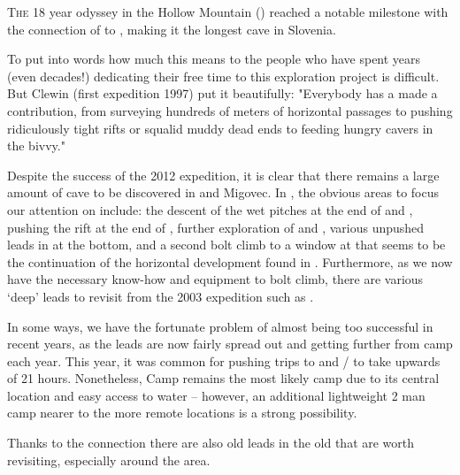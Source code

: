 \thispagestyle{endchapter}

\begin{tcolorbox}
\vspace{80pt}

\lettrine{T}{he} 18 year odyssey in the Hollow Mountain () reached a notable milestone with the connection of  to , making it the longest cave in Slovenia.

To put into words how much this means to the people who have spent years (even decades!) dedicating their free time to this exploration project is difficult. But Clewin (first expedition 1997) put it beautifully: "Everybody has a made a contribution, from surveying hundreds of meters of horizontal passages to pushing ridiculously tight rifts or squalid muddy dead ends to feeding hungry cavers in the bivvy."

Despite the success of the 2012 expedition, it is clear that there
remains a large amount of cave to be discovered in  and
Migovec. In , the obvious areas to focus our attention
on include: the descent of the wet pitches at the end of  and , pushing the rift at the end of , further exploration of  and ,
various unpushed leads in  at the bottom, and a
second bolt climb to a window at  that seems to
be the continuation of the horizontal development found in .
Furthermore, as we now have the necessary know-how and equipment to bolt
climb, there are various `deep' leads to revisit from the 2003
expedition such as .

In some ways, we have the fortunate problem of almost being too
successful in recent years, as the leads are now fairly spread out and
getting further from camp each year. This year, it was common for
pushing trips to  and
/ to take upwards of 21 hours.
Nonetheless, Camp  remains the most likely camp due to its
central location and easy access to water -- however, an additional
lightweight 2 man camp nearer to the more remote locations is a strong
possibility.

Thanks to the connection there are also old leads in the old  that
are worth revisiting, especially around the  area.




\end{tcolorbox}
\BgThispage